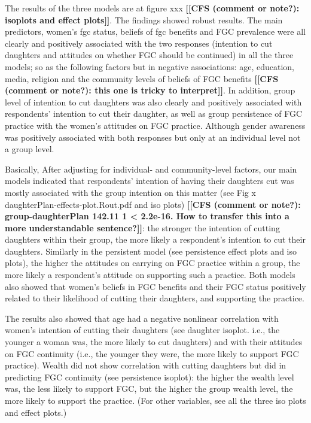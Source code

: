 \documentclass[12pt,]{article}
\newcommand{\comment}[1]{\textbf{[[#1]]}}
\newcommand{\cf}[1]{\comment{CFS (comment or note?): #1}}
\begin{document}
The results of the three models are at figure xxx \cf{isoplots and effect plots}.  The findings showed robust results.  The main predictors, women’s fgc status, beliefs of fgc benefits and FGC prevalence were all clearly and positively associated with the two responses (intention to cut daughters and attitudes on whether FGC should be continued) in all the three models; so as the following factors but in negative associations:  age, education, media, religion and the community levels of beliefs of FGC benefits \cf{this one is tricky to interpret}.  In addition, group level of intention to cut daughters was also clearly and positively associated with respondents’ intention to cut their daughter, as well as group persistence of FGC practice with the women’s attitudes on FGC practice.   Although gender awareness was positively associated with both responses but only at an individual level not a group level.

Basically, After adjusting for individual- and community-level factors, our main models indicated that respondents’ intention of having their daughters cut was mostly associated with the group intention on this matter (see Fig x daughterPlan-effects-plot.Rout.pdf and iso plots) \cf{group-daughterPlan  142.11  1  < 2.2e-16.  How to transfer this into a more understandable sentence?}:  the stronger the intention of cutting daughters within their group, the more likely a respondent’s intention to cut their daughters.  Similarly in the persistent model (see persistence effect plots and iso plots), the higher the attitudes on carrying on FGC practice within a group, the more likely a respondent’s attitude on supporting such a practice.  Both models also showed that women’s beliefs in FGC benefits and their FGC status positively related to their likelihood of cutting their daughters, and supporting the practice.

The results also showed that age had a negative nonlinear correlation with women’s intention of cutting their daughters (see daughter isoplot.  i.e., the younger a woman was, the more likely to cut daughters) and with their attitudes on FGC continuity (i.e., the younger they were,  the more likely to support FGC practice).  Wealth did not show correlation with cutting daughters but did in predicting FGC continuity (see persistence isoplot):  the higher the wealth level was, the less likely to support FGC, but the higher the group wealth level, the more likely to support the practice.  (For other variables, see all the three iso plots and effect plots.)
\end{document}
